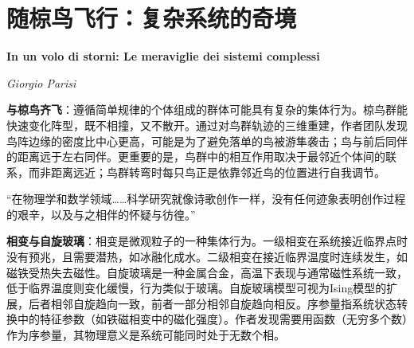 \chapter{随椋鸟飞行：复杂系统的奇境}
\Large\textbf{In un volo di storni: Le meraviglie dei sistemi complessi}
\par \emph{Giorgio Parisi} \normalsize

\par \textbf{与椋鸟齐飞}：遵循简单规律的个体组成的群体可能具有复杂的集体行为。椋鸟群能快速变化阵型，既不相撞，又不散开。通过对鸟群轨迹的三维重建，作者团队发现鸟阵边缘的密度比中心更高，可能是为了避免落单的鸟被游隼袭击；鸟与前后同伴的距离远于左右同伴。更重要的是，鸟群中的相互作用取决于最邻近个体间的联系，而非距离远近；鸟群转弯时每只鸟正是依靠邻近鸟的位置进行自我调节。

“在物理学和数学领域……科学研究就像诗歌创作一样，没有任何迹象表明创作过程的艰辛，以及与之相伴的怀疑与彷徨。”

\par \textbf{相变与自旋玻璃}：相变是微观粒子的一种集体行为。一级相变在系统接近临界点时没有预兆，且需要潜热，如冰融化成水。二级相变在接近临界温度时连续发生，如磁铁受热失去磁性。自旋玻璃是一种金属合金，高温下表现与通常磁性系统一致，低于临界温度则变化缓慢，行为类似于玻璃。自旋玻璃模型可视为Ising模型的扩展，后者相邻自旋趋向一致，前者一部分相邻自旋趋向相反。序参量指系统状态转换中的特征参数（如铁磁相变中的磁化强度）。作者发现需要用函数（无穷多个数）作为序参量，其物理意义是系统可能同时处于无数个相。
